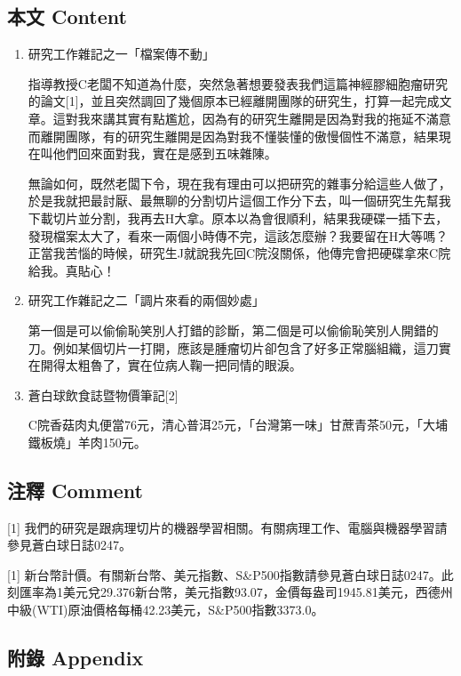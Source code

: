 \documentclass[
]{article}
\begin{document}
\hypertarget{ux672cux6587-content-13}{%
\subsection{本文 Content}\label{ux672cux6587-content-13}}

\begin{enumerate}
\def\labelenumi{\arabic{enumi}.}
\item
  研究工作雜記之一「檔案傳不動」

  指導教授C老闆不知道為什麼，突然急著想要發表我們這篇神經膠細胞瘤研究的論文{[}1{]}，並且突然調回了幾個原本已經離開團隊的研究生，打算一起完成文章。這對我來講其實有點尷尬，因為有的研究生離開是因為對我的拖延不滿意而離開團隊，有的研究生離開是因為對我不懂裝懂的傲慢個性不滿意，結果現在叫他們回來面對我，實在是感到五味雜陳。

  無論如何，既然老闆下令，現在我有理由可以把研究的雜事分給這些人做了，於是我就把最討厭、最無聊的分割切片這個工作分下去，叫一個研究生先幫我下載切片並分割，我再去H大拿。原本以為會很順利，結果我硬碟一插下去，發現檔案太大了，看來一兩個小時傳不完，這該怎麼辦？我要留在H大等嗎？正當我苦惱的時候，研究生J就說我先回C院沒關係，他傳完會把硬碟拿來C院給我。真貼心！
\item
  研究工作雜記之二「調片來看的兩個妙處」

  第一個是可以偷偷恥笑別人打錯的診斷，第二個是可以偷偷恥笑別人開錯的刀。例如某個切片一打開，應該是腫瘤切片卻包含了好多正常腦組織，這刀實在開得太粗魯了，實在位病人鞠一把同情的眼淚。
\item
  蒼白球飲食誌暨物價筆記{[}2{]}

  C院香菇肉丸便當76元，清心普洱25元，「台灣第一味」甘蔗青茶50元，「大埔鐵板燒」羊肉150元。
\end{enumerate}

\hypertarget{ux6ce8ux91cb-comment-13}{%
\subsection{注釋 Comment}\label{ux6ce8ux91cb-comment-13}}

{[}1{]}
我們的研究是跟病理切片的機器學習相關。有關病理工作、電腦與機器學習請參見蒼白球日誌0247。

{[}1{]}
新台幣計價。有關新台幣、美元指數、S\&P500指數請參見蒼白球日誌0247。此刻匯率為1美元兌29.376新台幣，美元指數93.07，金價每盎司1945.81美元，西德州中級(WTI)原油價格每桶42.23美元，S\&P500指數3373.0。

\hypertarget{ux9644ux9304-appendix-13}{%
\subsection{附錄 Appendix}\label{ux9644ux9304-appendix-13}}
\end{document}
